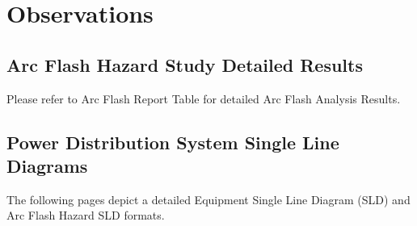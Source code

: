 \section{Observations}
\label{af:observations}

\subsection{Arc Flash Hazard Study Detailed Results}
\label{af:observations:at}

Please refer to Arc Flash Report Table for detailed Arc Flash Analysis Results.

\pagebreak

\subsection{Power Distribution System Single Line Diagrams}
\label{af:observations:sld}

The following pages depict a detailed Equipment Single Line Diagram (SLD) and Arc Flash Hazard SLD formats.